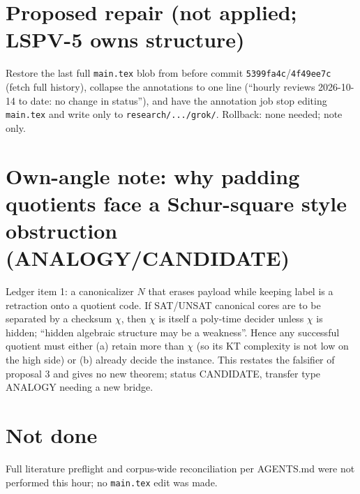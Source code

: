 \documentclass[11pt]{article}
\begin{document}
\section*{Proposed repair (not applied; LSPV-5 owns structure)}
Restore the last full \texttt{main.tex} blob from before commit \texttt{5399fa4c}/\texttt{4f49ee7c} (fetch full history), collapse the annotations to one
line (``hourly reviews 2026-10-14 to date: no change in status''), and have the annotation job stop editing \texttt{main.tex} and write only to
\texttt{research/.../grok/}. Rollback: none needed; note only.

\section*{Own-angle note: why padding quotients face a Schur-square style obstruction (ANALOGY/CANDIDATE)}
Ledger item 1: a canonicalizer $N$ that erases payload while keeping label is a retraction onto a quotient code. If SAT/UNSAT canonical cores
are to be separated by a checksum $\chi$, then $\chi$ is itself a poly-time decider unless $\chi$ is hidden; ``hidden algebraic structure
may be a weakness''. Hence any successful quotient must either (a) retain more than $\chi$ (so its KT complexity is not low on the high side)
or (b) already decide the instance. This restates the falsifier of proposal 3 and gives no new theorem; status CANDIDATE, transfer type
ANALOGY needing a new bridge.

\section*{Not done}
Full literature preflight and corpus-wide reconciliation per AGENTS.md were not performed this hour; no \texttt{main.tex} edit was made.
\end{document}
